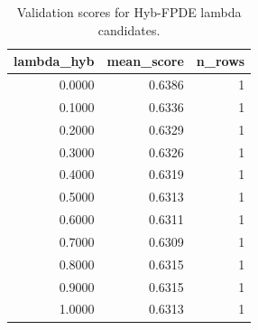 \begin{table}[t]
\caption{Validation scores for Hyb-FPDE lambda candidates.}
\label{tab:lambda_distribution_computed}
\centering
\begin{tabular}{rrr}
\toprule
lambda\_hyb & mean\_score & n\_rows \\
\midrule
0.0000 & 0.6386 & 1 \\
0.1000 & 0.6336 & 1 \\
0.2000 & 0.6329 & 1 \\
0.3000 & 0.6326 & 1 \\
0.4000 & 0.6319 & 1 \\
0.5000 & 0.6313 & 1 \\
0.6000 & 0.6311 & 1 \\
0.7000 & 0.6309 & 1 \\
0.8000 & 0.6315 & 1 \\
0.9000 & 0.6315 & 1 \\
1.0000 & 0.6313 & 1 \\
\bottomrule
\end{tabular}

\end{table}
